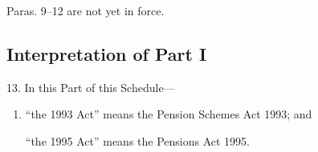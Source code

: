 \documentclass[12pt,a4paper]{article}
\begin{document}
{%
%
%
%
%
%
%
%
%
%
%
%
%
Paras. 9--12 are not yet in force.
}

\subsection*{Interpretation of Part I}

13. In this Part of this Schedule—
\begin{enumerate}\item[]
    “the 1993 Act” means the Pension Schemes Act 1993; and

    “the 1995 Act” means the Pensions Act 1995.  
\end{enumerate}
\end{document}

